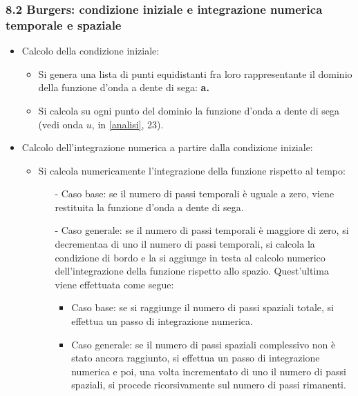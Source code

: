 \subsubsection*{8.2 Burgers: condizione iniziale e integrazione numerica temporale e spaziale}
\begin{itemize}
\item Calcolo della condizione iniziale:
\begin{itemize}
\item Si genera una lista di punti equidistanti fra loro rappresentante il dominio della funzione d'onda a dente di sega: \textbf{a.} 
\item Si calcola su ogni punto del dominio la funzione d'onda a dente di sega (vedi onda $u$, in \ref{analisi}, 23). 
\end{itemize}
\item Calcolo dell'integrazione numerica a partire dalla condizione iniziale:
\begin{itemize}
\item Si calcola numericamente l'integrazione della funzione rispetto al tempo:
\begin{itemize}
\item[-] Caso base: se il numero di passi temporali è uguale a zero, viene restituita la funzione d'onda a dente di sega.
\item[-] Caso generale: se il numero di passi temporali è maggiore di zero, si decrementaa di uno il numero di passi temporali, si calcola la condizione di bordo e la si aggiunge in testa al calcolo numerico dell'integrazione della funzione rispetto allo spazio. Quest'ultima viene effettuata come segue:
\begin{itemize}
\item Caso base: se si raggiunge il numero di passi spaziali totale, si effettua un passo di integrazione numerica.
\item Caso generale: se il numero di passi spaziali complessivo non è stato ancora raggiunto, si effettua un passo di integrazione numerica e poi, una volta incrementato di uno il numero di passi spaziali, si procede ricorsivamente sul numero di passi rimanenti. 
\end{itemize}
\end{itemize}
\end{itemize}
\end{itemize}

